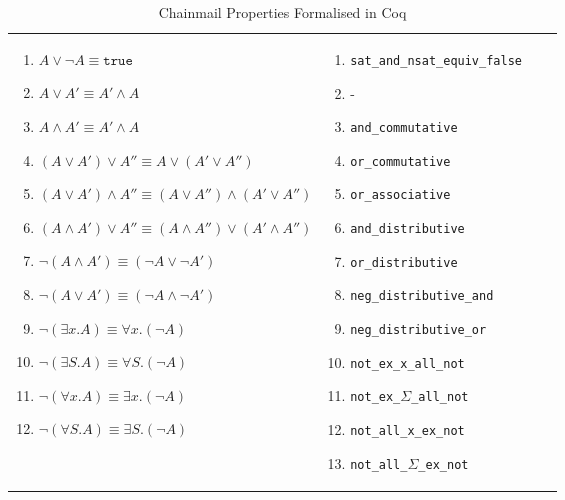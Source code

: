 \begin{table}
\begin{tabular}{|l|l|l|l|}
{\begin{enumerate}[label={(\arabic*)}]
            \item $A \vee \neg A \equiv \texttt{true}$
            \item $A \vee A' \equiv A' \wedge A$
            \item $A \wedge A' \equiv A' \wedge A$
            \item $(A \vee A') \vee A'' \equiv A \vee (A' \vee A'')$
            \item $(A \vee A') \wedge A'' \equiv (A \vee A'') \wedge (A' \vee A'')$
            \item $(A \wedge A') \vee A'' \equiv (A \wedge A'') \vee (A' \wedge A'')$
            \item $\neg (A \wedge A') \equiv (\neg A \vee \neg A')$
            \item $\neg (A \vee A') \equiv (\neg A \wedge \neg A')$
            \item $\neg (\exists x.A) \equiv \forall x. (\neg A)$
            \item $\neg (\exists S.A) \equiv \forall S. (\neg A)$
            \item $\neg (\forall x.A) \equiv \exists x. (\neg A)$
            \item $\neg (\forall S.A) \equiv \exists S. (\neg A)$
        \end{enumerate}}
        & 
\parbox{.45\textwidth}{\scriptsize\begin{enumerate}[label={(\arabic*)}]
            \item \texttt{sat\_and\_nsat\_equiv\_false}
            \item -
            \item \texttt{and\_commutative}
            \item \texttt{or\_commutative}
            \item \texttt{or\_associative}
            \item \texttt{and\_distributive}
            \item \texttt{or\_distributive}
            \item \texttt{neg\_distributive\_and}
            \item \texttt{neg\_distributive\_or}
            \item \texttt{not\_ex\_x\_all\_not}
            \item \texttt{not\_ex\_$\Sigma$\_all\_not}
            \item \texttt{not\_all\_x\_ex\_not}
            \item \texttt{not\_all\_$\Sigma$\_ex\_not}
        \end{enumerate}}
\\
\hline
  \end{tabular}
  \caption{Chainmail Properties Formalised in Coq}
  \label{Coq}
\end{table}
